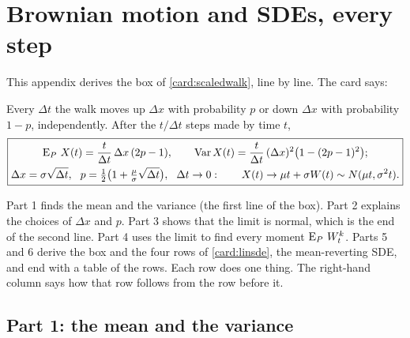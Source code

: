 \chapter{Brownian motion and SDEs, every step}\label{app:walk}

This appendix derives the box of \cref{card:scaledwalk}, line by line. The card says:

\begin{setup}
Every $\Delta t$ the walk moves up $\Delta x$ with probability $p$ or down $\Delta x$ with probability $1-p$, independently. After the $t/\Delta t$ steps made by time $t$,
\[
  \boxed{\begin{gathered}\E_P\,X(t)=\frac{t}{\Delta t}\,\Delta x\,(2p-1),\qquad \Var X(t)=\frac{t}{\Delta t}\,(\Delta x)^2\big(1-(2p-1)^2\big);\\
  \Delta x=\sigma\sqrt{\Delta t},\ \ p=\tfrac12\big(1+\tfrac{\mu}{\sigma}\sqrt{\Delta t}\big),\ \ \Delta t\to0:\qquad X(t)\to\mu t+\sigma W(t)\sim N(\mu t,\sigma^2t).\end{gathered}}
\]
\end{setup}

Part 1 finds the mean and the variance (the first line of the box). Part 2 explains the choices of $\Delta x$ and $p$. Part 3 shows that the limit is normal, which is the end of the second line. Part 4 uses the limit to find every moment $\operatorname{E}_P\,W_t^k$. Parts 5 and 6 derive the box and the four rows of \cref{card:linsde}, the mean-reverting SDE, and end with a table of the rows. Each row does one thing. The right-hand column says how that row follows from the row before it.

\section*{Part 1: the mean and the variance}

